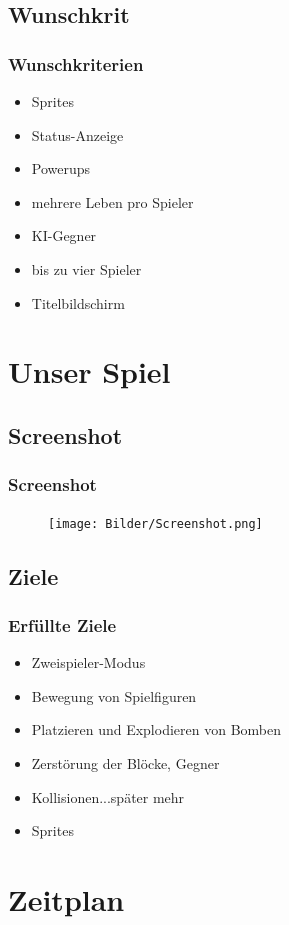\documentclass[18pt]{beamer}
\begin{document}
		\subsection{Wunschkrit}
		\begin{frame}
			\frametitle{Wunschkriterien}
				\begin{itemize}
					\item Sprites
					\item Status-Anzeige
					\item Powerups
					\item mehrere Leben pro Spieler
					\item KI-Gegner
					\item bis zu vier Spieler
					\item Titelbildschirm
				\end{itemize}
		\end{frame}
	
\section{Unser Spiel}
	\subsection{Screenshot}
	\begin{frame}
		\frametitle{Screenshot}
		\begin{figure}[H]
			\centering
			\texttt{[image: Bilder/Screenshot.png]}
			\centering
		\end{figure}
	\end{frame}

	\subsection{Ziele}
	\begin{frame}
		\frametitle{Erfüllte Ziele}
		\begin{itemize}
			\item Zweispieler-Modus
			\item Bewegung von Spielfiguren
			\item Platzieren und Explodieren von Bomben
			\item Zerstörung der Blöcke, Gegner
			\item Kollisionen...später mehr
			\item Sprites
		\end{itemize}
	\end{frame}
	
	
\section{Zeitplan}
\end{document}
